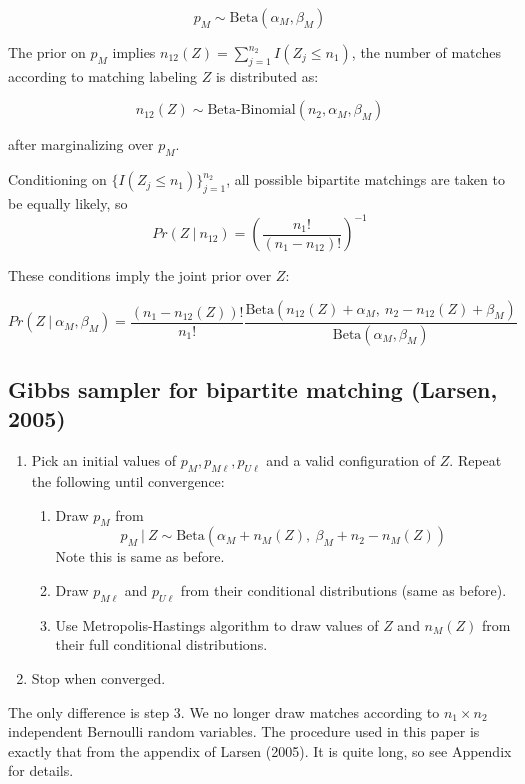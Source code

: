 \documentclass[11pt,reqno]{amsart}
\begin{document}
$$ p_M \sim \text{Beta}(\alpha_{M}, \beta_{M})$$ 

The prior on $p_M$ implies $n_{12}(Z) = \sum_{j=1}^{n_2} I(Z_j \leq n_1)$, the number of matches according to matching labeling $Z$ is distributed as:

$$n_{12}(Z) \sim \text{Beta-Binomial}(n_2, \alpha_{M}, \beta_{M}) $$ 

after marginalizing over $p_M$.

Conditioning on $\{I(Z_j \leq n_1)\}_{j=1}^{n_2}$, all possible bipartite matchings are taken to be equally likely, so $$Pr(Z\ |\ n_{12}) = \left(\frac{n_1!}{(n_1-n_{12})!}\right)^{-1}$$

These conditions imply the joint prior over $Z$:

$$Pr(Z\ |\ \alpha_M, \beta_M) = \frac{(n_1-n_{12}(Z))!}{n_1!}\frac{\text{Beta}(n_{12}(Z) + \alpha_M,\ n_2-n_{12}(Z) + \beta_M)}{\text{Beta}(\alpha_M, \beta_M)}$$

\subsection{Gibbs sampler for bipartite matching (Larsen, 2005)}

\begin{enumerate} 
\item Pick an initial values of $p_M, p_{M\ell}, p_{U\ell}$ and a valid configuration of $Z$.  Repeat the following until convergence:
\begin{enumerate} 
\item Draw $p_M$ from $$ p_M\ |\ Z \sim \text{Beta}(\alpha_M + n_{M}(Z),\ \beta_M + n_{2} - n_{M}(Z)) $$ Note this is same as before. 

\item  Draw $p_{M\ell}$ and $p_{U\ell}$ from their conditional distributions (same as before).

\item Use Metropolis-Hastings algorithm to draw values of $Z$ and $n_{M}(Z)$ from their full conditional distributions. 

\end{enumerate}

\item Stop when converged. 
\end{enumerate}
The only difference is step 3.  We no longer draw matches according to $n_1\times n_2$ independent Bernoulli random variables.  The procedure used in this paper is exactly that from the appendix of Larsen (2005).  It is quite long, so see Appendix for details. 
\end{document}
